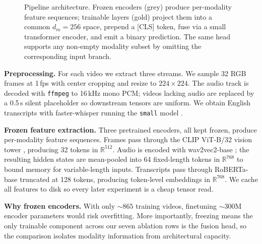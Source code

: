 \documentclass{article}
\begin{document}
\begin{figure}[t]
{%
}
\caption{Pipeline architecture. Frozen encoders (grey) produce per-modality feature sequences; trainable layers (gold) project them into a common $d_m{=}256$ space, prepend a [CLS] token, fuse via a small transformer encoder, and emit a binary prediction. The same head supports any non-empty modality subset by omitting the corresponding input branch.}
\label{fig:arch}
\end{figure}

\textbf{Preprocessing.} For each video we extract three streams. We sample 32 RGB frames at 1\,fps with center cropping and resize to $224 \times 224$. The audio track is decoded with \texttt{ffmpeg} to 16\,kHz mono PCM; videos lacking audio are replaced by a 0.5\,s silent placeholder so downstream tensors are uniform. We obtain English transcripts with faster-whisper running the \texttt{small} model \cite{radford2022whisper}.

\textbf{Frozen feature extraction.} Three pretrained encoders, all kept frozen, produce per-modality feature sequences. Frames pass through the CLIP ViT-B/32 vision tower \cite{radford2021clip}, producing 32 tokens in $\mathbb{R}^{512}$. Audio is encoded with wav2vec2-base \cite{baevski2020wav2vec2}; the resulting hidden states are mean-pooled into 64 fixed-length tokens in $\mathbb{R}^{768}$ to bound memory for variable-length inputs. Transcripts pass through RoBERTa-base \cite{liu2019roberta} truncated at 128 tokens, producing token-level embeddings in $\mathbb{R}^{768}$. We cache all features to disk so every later experiment is a cheap tensor read.

\textbf{Why frozen encoders.} With only ${\sim}865$ training videos, finetuning ${\sim}300$M encoder parameters would risk overfitting. More importantly, freezing means the only trainable component across our seven ablation rows is the fusion head, so the comparison isolates modality information from architectural capacity.
\end{document}

